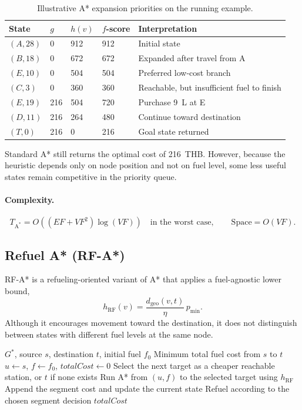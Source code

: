 \begin{table}[ht]
\centering
\caption{Illustrative A* expansion priorities on the running example.}
\label{tab:astar_trace}
\small
\begin{tabular}{@{}lllll@{}}
\toprule
State & $g$ & $h(v)$ & $f$-score & Interpretation \\
\midrule
$(A,28)$ & 0 & 912 & 912 & Initial state \\
$(B,18)$ & 0 & 672 & 672 & Expanded after travel from A \\
$(E,10)$ & 0 & 504 & 504 & Preferred low-cost branch \\
$(C,3)$ & 0 & 360 & 360 & Reachable, but insufficient fuel to finish \\
$(E,19)$ & 216 & 504 & 720 & Purchase 9~L at E \\
$(D,11)$ & 216 & 264 & 480 & Continue toward destination \\
$(T,0)$ & 216 & 0 & 216 & Goal state returned \\
\bottomrule
\end{tabular}
\end{table}

Standard A* still returns the optimal cost of 216~THB. However, because the heuristic depends only on node position and not on fuel level, some less useful states remain competitive in the priority queue.

\paragraph{Complexity.}
\[
T_{\mathrm{A^{*}}}=O\!\left((EF+VF^{2})\log(VF)\right)
\quad \text{in the worst case},
\qquad
\text{Space}=O(VF).
\]

\subsection{Refuel A* (RF-A*)}
\label{subsec:rfastar}

RF-A* is a refueling-oriented variant of A* that applies a fuel-agnostic lower bound,
\[
h_{\mathrm{RF}}(v)=\frac{d_{\mathrm{geo}}(v,t)}{\eta}\,p_{\min}.
\]
Although it encourages movement toward the destination, it does not distinguish between states with different fuel levels at the same node.

\begin{algorithm}[H]
\caption{RF-A* Search for Fuel-Aware Routing}
\label{alg:rfastar}
\begin{algorithmic}[1]
\Require $G^{*}$, source $s$, destination $t$, initial fuel $f_0$
\Ensure Minimum total fuel cost from $s$ to $t$
\State $u \gets s$, $f \gets f_0$, $\mathit{totalCost} \gets 0$
    \State Select the next target as a cheaper reachable station, or $t$ if none exists
    \State Run A* from $(u,f)$ to the selected target using $h_{\mathrm{RF}}$
    \State Append the segment cost and update the current state
        \State Refuel according to the chosen segment decision
    \EndIf
\EndWhile
\State \Return $\mathit{totalCost}$
\end{algorithmic}
\end{algorithm}

